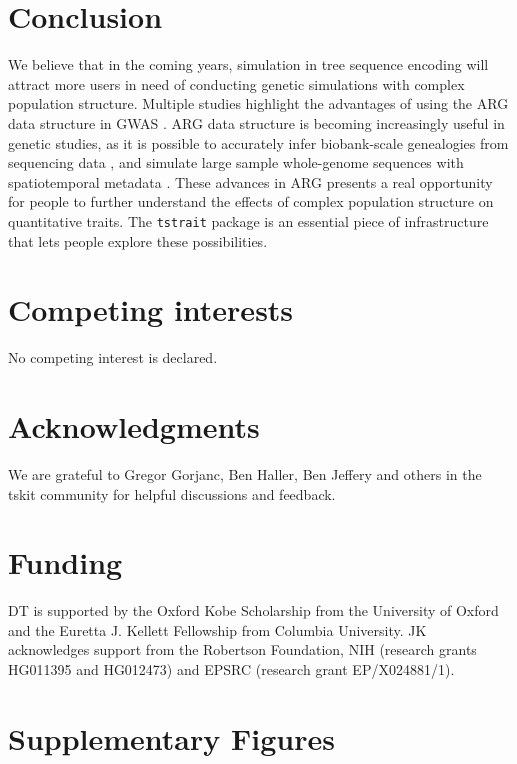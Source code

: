\documentclass[unnumsec,webpdf,modern,large,namedate]{oup-authoring-template}%
\begin{document}
\section{Conclusion}
We believe that in the coming years, simulation in tree sequence encoding will
attract more users in need of conducting genetic simulations with complex
population structure. Multiple studies highlight the advantages of using the
ARG data structure in GWAS \citep{link2023tree,nowbandegani2023extremely,zhang2023}.
ARG data
structure is becoming increasingly useful in genetic studies, as it is possible
to accurately infer biobank-scale genealogies from sequencing data
\citep{zhang2023}, and simulate large sample whole-genome sequences with
spatiotemporal metadata \citep{anderson2023}. These advances in ARG presents a
real opportunity for people to further understand the effects of complex
population structure on quantitative traits. The \texttt{tstrait} package is an
essential piece of infrastructure that lets people explore these possibilities.

\section{Competing interests}
No competing interest is declared.

\section{Acknowledgments}
We are grateful to Gregor Gorjanc, Ben Haller, Ben Jeffery and
others in the tskit community for helpful discussions and feedback.

\section{Funding}
DT is supported by the Oxford Kobe Scholarship from the University of Oxford
and the Euretta J. Kellett Fellowship from Columbia University.
JK acknowledges support from the Robertson Foundation,
NIH (research grants HG011395 and HG012473) and
EPSRC (research grant EP/X024881/1).





\clearpage

\renewcommand\thefigure{S\arabic{figure}}
\setcounter{figure}{0}
\renewcommand\thetable{S\arabic{table}}
\setcounter{table}{0}
\section{Supplementary Figures}
\end{document}
